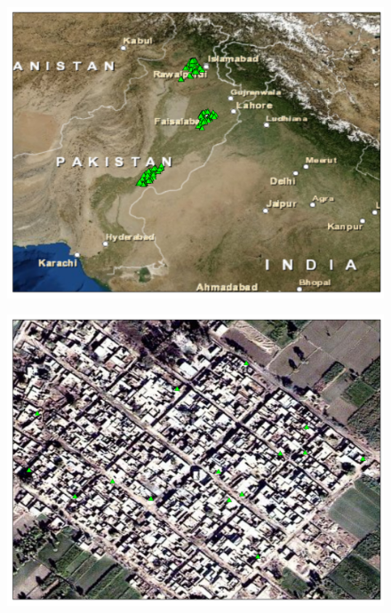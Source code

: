 \documentclass{beamer}
\begin{document}
\begin{frame}{}
	\begin{figure}[htb]
		\begin{center}
		\includegraphics[scale=0.4]{maps/hh_map_allpak.pdf}
		\end{center}
	\end{figure}
\end{frame}


\begin{frame}{}
	\begin{figure}[htb]
		\begin{center}
		\includegraphics[scale=0.4]{maps/concentrated.pdf}
		\end{center}
	\end{figure}
\end{frame}
\end{document}
